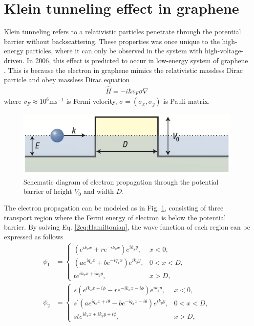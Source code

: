 \section{Klein tunneling effect in graphene} \label{2sec:klein effect}
    Klein tunneling refers to a relativistic particles penetrate through the potential barrier without backscattering.
    These properties was once unique to the high-energy particles, where it can only be observed in the system with high-voltage-driven.
    In 2006, this effect is predicted to occur in low-energy system of graphene \cite{Katsnelson2006a}.
    This is because the electron in graphene mimics the relativistic massless Dirac particle and obey massless Dirac equation
    \begin{align} \label{2eq:Hamiltonian}
        \hat{H} = -i\hbar v_F \sigma \nabla 
    \end{align}
    where $v_F \approx 10^6 \mathrm{ms^{-1}}$ is Fermi velocity, $\sigma = (\sigma_x, \sigma_y)$ is Pauli matrix. 
    \begin{figure}[H]
        \centering
        \includegraphics[width=0.7\linewidth]{fig/Chap 2/electron propagation.png}
        \caption{Schematic diagram of electron propagation through the potential barrier of height $V_0$ and width $D$.}
        \label{2fig:electron propagation}
    \end{figure}
    The electron propagation can be modeled as in Fig. \ref{2fig:electron propagation}, consisting of three transport region where the Fermi energy of electron is below the potential barrier.
    By solving Eq. \ref{2eq:Hamiltonian}, the wave function of each region can be expressed as follows
    \begin{equation} \label{2eq:wave function}
        \begin{aligned}
            \psi_1 &= \begin{cases} (e^{ik_x x}+re^{-ik_x x})e^{ik_y y}, &x<0,\\
                (ae^{i q_x x}+be^{-i q_x x})e^{ik_y y},  &0<x<D,\\
                te^{ik_x x + ik_y y},  &x>D,
                \end{cases}\\
            \psi_2 &= \begin{cases} s(e^{ik_x x+i \phi}-re^{-ik_x x-i \phi})e^{ik_y y},  &x<0,\\
                s^\prime(ae^{i q_x x+ i \theta}-be^{-i q_x x- i \theta})e^{ik_y y}, &0<x<D,\\
                ste^{ik_x x + ik_y y+ i \phi}, &x>D,
                \end{cases}
        \end{aligned}
    \end{equation}

